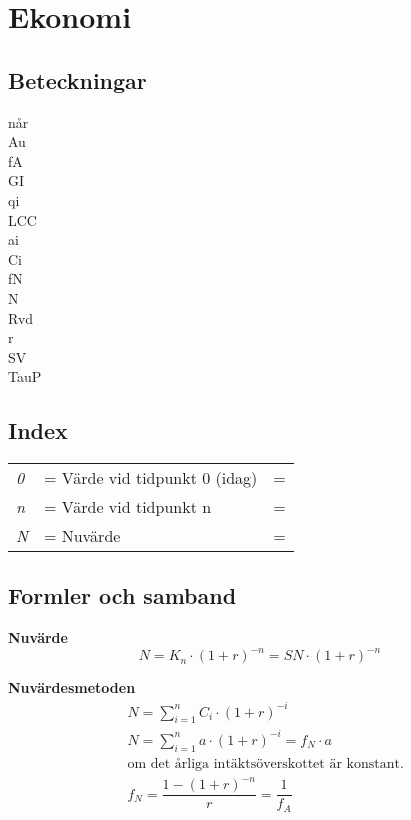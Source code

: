 \chapter{Ekonomi}
\section*{Beteckningar}
\acrfull{når}\\
\acrfull{Au}\\
\acrfull{fA}\\
\acrfull{GI}\\
\acrfull{qi}\\
\acrfull{LCC}\\
\acrfull{ai}\\
\acrfull{Ci}\\
\acrfull{fN}\\
\acrfull{N}\\
\acrfull{Rvd}\\
\acrfull{r}\\
\acrfull{SV}\\
\acrfull{TauP}

\section*{Index}
	\begin{tabularx}{\linewidth} { l
	>{\raggedright\arraybackslash\hsize=1.5\hsize\linewidth=\hsize}X
	>{\raggedright\arraybackslash\hsize=0.5\hsize\linewidth=\hsize}X}
	\textit{0} & Värde vid tidpunkt 0 (idag)\\ 
  \textit{n} & Värde vid tidpunkt n\\ 
	\textit{N} & Nuvärde 
	\end{tabularx}

\section*{Formler och samband}

\textbf{Nuvärde}
\begin{equation*}
  N=K_n \cdot (1 + r)^{-n} = SN \cdot (1 + r)^{-n}
\end{equation*}

\textbf{Nuvärdesmetoden}
\begin{align*}
  & N = \sum_{i=1}^{n} C_i \cdot (1+r)^{-i} \\
  & N = \sum_{i=1}^{n} a \cdot (1+r)^{-i} = f_N \cdot a \\
  & \text{om det årliga intäktsöverskottet är konstant.} \\
  & f_N = \dfrac{1-(1+r)^{-n}}{r} = \dfrac{1}{f_A}
\end{align*}

